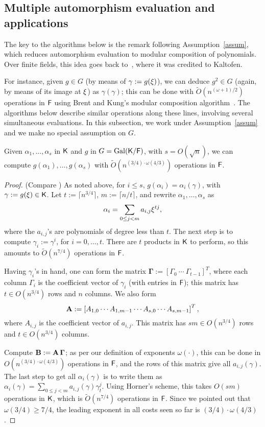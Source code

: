 \subsection{Multiple automorphism evaluation and applications}

The key to the algorithms below is the remark following
Assumption~\ref{assum}, which reduces automorphism evaluation to
modular composition of polynomials.  Over finite fields, this idea
goes back to~\cite{GaSh92}, where it was credited to Kaltofen.

For instance, given $g \in G$ (by means of $\gamma:=g(\xi)$), we can
deduce $g^2 \in G$ (again, by means of its image at $\xi$) as
$\gamma(\gamma)$; this can be done with $\tilde{O}(n^{(\omega+1)/2})$
operations in ${\mathsf{F}}$ using Brent and Kung's modular composition
algorithm~\citep{BrKu78}. The algorithms below describe similar
operations along these lines, involving several simultaneous
evaluations. In this subsection, we work under Assumption~\ref{assum}
and we make no special assumption on $G$.

\begin{lemma}
  \label{lem:modcom}
  Given $\alpha_1,\dots,\alpha_s$ in ${\mathsf{K}}$ and $g$ in $G =
  \mathrm{Gal}({\mathsf{K}}/{\mathsf{F}})$, with $s = O(\sqrt{n})$, we can compute
  $g(\alpha_1),\dots,g(\alpha_s)$ with $\tilde
  O(n^{(3/4)\cdot\omega(4/3)})$ operations in ${\mathsf{F}}$.
\end{lemma}
\begin{proof}
(Compare \cite[Lemma~3]{KalSho98}) As noted above, for $i\le s$,
  $g(\alpha_i) = \alpha_i(\gamma)$, with $\gamma := g(\xi) \in {\mathsf{K}}$.
  Let $t := \lceil n^{3/4} \rceil$, $m:=\lceil n/t\rceil$, and rewrite $\alpha_1 , \ldots , \alpha_s$ as 
$$\alpha_i = \sum_{0 \leq j < m} a_{i,j}\xi^{tj},$$ where the
  $a_{i,j}$'s are polynomials of degree less than $t$. The next step
  is to compute $\gamma_i := \gamma^i$, for $i = 0 , \ldots , t$.
  There are $t$ products in ${\mathsf{K}}$ to perform, so this amounts to
  $\tilde{O}(n^{7/4})$ operations in ${\mathsf{F}}$.

  Having $\gamma_i$'s in hand, one can form the matrix
  $\boldsymbol{\Gamma} := \left[ \Gamma_0 ~ \cdots ~ \Gamma_{t-1}
    \right]^T$, where each column $\Gamma_i$ is the coefficient vector
  of $\gamma_i$ (with entries in ${\mathsf{F}}$); this matrix has $t \in
  O(n^{3/4})$ rows and $n$ columns. We also form
  $$\mat A := \left[{A}_{1,0} \cdots {A}_{1,m-1} \cdots
    {A}_{s,0} \cdots {A}_{s,m-1}\right]^T,$$ where
  ${A}_{i,j}$ is the coefficient vector of $a_{i,j}$. This matrix 
  has $s m \in O(n^{3/4})$ rows and $t \in O(n^{3/4})$ columns.

  Compute $\mat B:=\mat A\, \boldsymbol{\Gamma}$; as per our
  definition of exponents $\omega(\cdot )$, this can be done in
  $O(n^{(3/4)\cdot \omega(4/3)})$ operations in ${\mathsf{F}}$, and the rows of this matrix
  give all $a_{i,j}(\gamma)$.  The last step to get all
  $\alpha_i(\gamma)$ is to write them as $\alpha_i(\gamma) = \sum_{0
    \leq j < m} a_{i,j}(\gamma) \gamma_t^{j}.$ Using Horner's scheme,
  this takes $O(sm)$ operations in ${\mathsf{K}}$, which is $\tilde{O}(n^{7/4})$
  operations in ${\mathsf{F}}$. Since we pointed out that $\omega(3/4) \ge 7/4$,
  the leading exponent in all costs seen so far is
  $(3/4)\cdot\omega(4/3)$.
\end{proof}


